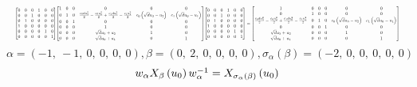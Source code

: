 \documentclass[11pt]{article}
\theoremstyle{definition}
\begin{document}
\[
\scaletoalign{\textwidth}{{\left[\begin{matrix}0 & 0 & 0 & 1 & 0 & 0\\0 & 0 & 1 & 0 & 0 & 0\\0 & 1 & 0 & 0 & 0 & 0\\1 & 0 & 0 & 0 & 0 & 0\\0 & 0 & 0 & 0 & 1 & 0\\0 & 0 & 0 & 0 & 0 & 1\end{matrix}\right]} {\left[\begin{matrix}1 & 0 & 0 & 0 & 0 & 0\\0 & 1 & 0 & \frac{c_{0} d u_{3}^{2}}{2} - \frac{c_{0} u_{2}^{2}}{2} + \frac{c_{1} d u_{0}^{2}}{2} - \frac{c_{1} u_{1}^{2}}{2} & c_{0} \left(\sqrt{d} u_{3} - u_{2}\right) & c_{1} \left(\sqrt{d} u_{0} - u_{1}\right)\\0 & 0 & 1 & 0 & 0 & 0\\0 & 0 & 0 & 1 & 0 & 0\\0 & 0 & 0 & \sqrt{d} u_{3} + u_{2} & 1 & 0\\0 & 0 & 0 & \sqrt{d} u_{0} + u_{1} & 0 & 1\end{matrix}\right]} {\left[\begin{matrix}0 & 0 & 0 & 1 & 0 & 0\\0 & 0 & 1 & 0 & 0 & 0\\0 & 1 & 0 & 0 & 0 & 0\\1 & 0 & 0 & 0 & 0 & 0\\0 & 0 & 0 & 0 & 1 & 0\\0 & 0 & 0 & 0 & 0 & 1\end{matrix}\right]} = {\left[\begin{matrix}1 & 0 & 0 & 0 & 0 & 0\\0 & 1 & 0 & 0 & 0 & 0\\\frac{c_{0} d u_{3}^{2}}{2} - \frac{c_{0} u_{2}^{2}}{2} + \frac{c_{1} d u_{0}^{2}}{2} - \frac{c_{1} u_{1}^{2}}{2} & 0 & 1 & 0 & c_{0} \left(\sqrt{d} u_{3} - u_{2}\right) & c_{1} \left(\sqrt{d} u_{0} - u_{1}\right)\\0 & 0 & 0 & 1 & 0 & 0\\\sqrt{d} u_{3} + u_{2} & 0 & 0 & 0 & 1 & 0\\\sqrt{d} u_{0} + u_{1} & 0 & 0 & 0 & 0 & 1\end{matrix}\right]}}
\]
\[
\alpha = \left( -1, \  -1, \  0, \  0, \  0, \  0\right), \beta = \left( 0, \  2, \  0, \  0, \  0, \  0\right), \sigma_{\alpha}(\beta) = \left( -2, \  0, \  0, \  0, \  0, \  0\right)
\]
\[
\scaletoalign{\textwidth}{w_{\alpha} X_{\beta}\left(u_{0}\right) w_{\alpha}^{-1} = X_{\sigma_{\alpha}\left(\beta\right)}\left(u_{0}\right)}
\]
\end{document}
